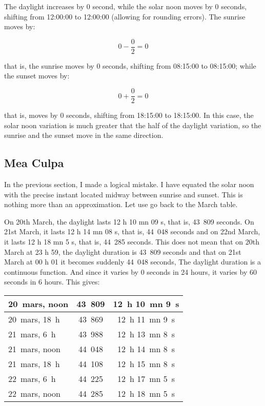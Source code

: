 \documentclass[a4paper]{article}
\newenvironment{texte}{\rmfamily}{}
\newcommand{\everisehhmmss}[0]{08:15:00}
\newcommand{\evenoonhhmmss}[0]{12:00:00}
\newcommand{\evesethhmmss}[0]{18:15:00}
\newcommand{\dayrisehhmmss}[0]{08:15:00}
\newcommand{\daynoonhhmmss}[0]{12:00:00}
\newcommand{\daysethhmmss}[0]{18:15:00}
\newcommand{\deltalight}[0]{0}
\newcommand{\deltarise}[0]{0}
\newcommand{\deltanoon}[0]{0}
\newcommand{\deltaset}[0]{0}
\newcommand{\formularise}[0]{\[ \deltanoon - \frac{\deltalight}{2} = \deltarise \]}
\newcommand{\formulaset}[0]{\[ \deltanoon + \frac{\deltalight}{2} = \deltaset \]}
\begin{document}
\begin{texte}
The daylight increases by \deltalight{} second,
while the solar noon moves by \deltanoon{} seconds,
shifting from \evenoonhhmmss{} to \daynoonhhmmss{}
(allowing for rounding errors).
The sunrise moves by:

\formularise{}

that is, the sunrise moves by \deltarise{}
seconds, shifting from \everisehhmmss{} to \dayrisehhmmss{};
while the sunset moves by:

\formulaset{}

that is, moves by \deltaset{} seconds,
shifting from \evesethhmmss{} to \daysethhmmss{}.
In this case, the solar noon variation is much greater
that the half of the daylight variation, so the sunrise and
the sunset move in the same direction.

\vspace{5mm}

\subsection{Mea Culpa}

In the previous section, I made a logical mistake.
I have equated the solar noon with the precise instant located midway
between sunrise and sunset. This is nothing more than
an approximation. Let use go back to the March table.

\vspace{2mm}
\vspace{2mm}

On 20th March, the daylight lasts 12 h 10 mn 09 s, that is, 43~809 seconds.
On 21st March, it lasts 12 h 14 mn 08 s, that is, 44~048 seconds
and on 22nd March, it lasts  12 h 18 mn 5 s, that is, 44~285 seconds.
This does not mean that on 20th March at 23 h 59, the daylight
duration is 43~809 seconds and that on 21st March
at 00 h 01 it becomes suddenly 44~048 seconds,
The daylight duration is a continuous function.
And since it varies by \deltalight{} seconds in
24 hours, it varies by 60 seconds in 6 hours.
This gives:

\vspace{2mm}
\begin{tabular}{|l|c|c|}
\hline
20~mars, noon & 43~809 & 12~h 10~mn 9~s \\
\hline
20~mars, 18~h & 43~869 & 12~h 11~mn 9~s \\
\hline
21~mars, 6~h & 43~988 & 12~h 13~mn 8~s \\
\hline
21~mars, noon & 44~048 & 12~h 14~mn 8~s \\
\hline
21~mars, 18~h & 44~108 & 12~h 15~mn 8~s \\
\hline
22~mars, 6~h & 44~225 & 12~h 17~mn 5~s \\
\hline
22~mars, noon & 44~285 & 12~h 18~mn 5~s \\
\hline
\end{tabular}
\vspace{2mm}


\end{texte}
\end{document}
